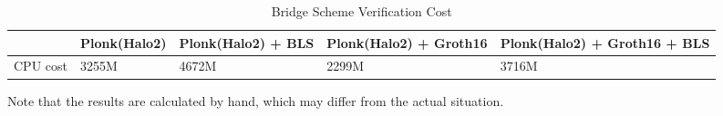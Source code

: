 \documentclass{article}
\begin{document}
\begin{table}[H]
    \centering
    \begin{tabular}{p{1.5cm}|p{2cm}|p{2cm}|p{2cm}|p{4cm}} \hline
          & Plonk(Halo2)&Plonk(Halo2) + BLS & Plonk(Halo2) + Groth16 & Plonk(Halo2) + Groth16 + BLS\\ \hline
          CPU cost & 3255M & 4672M & 2299M & 3716M \\ \hline
         
    \end{tabular}
    \caption{Bridge Scheme Verification Cost}
    \label{tab:my_label}
\end{table}

Note that the results are calculated by hand, which may differ from the actual situation.
\end{document}
